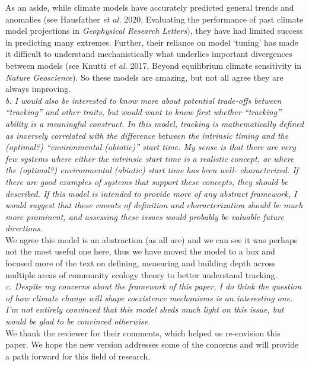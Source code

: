 \documentclass[11pt]{article}
\begin{document}
As an aside, while climate models have accurately predicted general trends and anomalies (see Hausfather \emph{et al.} 2020, Evaluating the performance of past climate model projections in \emph{Geophysical Research Letters}), they have had limited success in predicting many extremes. Further, their reliance on model `tuning' has made it difficult to understand mechanistically what underlies important divergences between models (see Knutti \emph{et al.} 2017, Beyond equilibrium climate sensitivity in \emph{Nature Geoscience}). So these models are amazing, but not all agree they are always improving. \\

\emph{b.      I would also be interested to know more about potential trade-offs between ``tracking''
and other traits, but would want to know first whether ``tracking'' ability is a meaningful
construct. In this model, tracking is mathematically defined as inversely correlated with the
difference between the intrinsic timing and the (optimal?) ``environmental (abiotic)'' start
time. My sense is that there are very few systems where either the intrinsic start time is a
realistic concept, or where the (optimal?) environmental (abiotic) start time has been well-
characterized. If there are good examples of systems that support these concepts, they should
be described. If this model is intended to provide more of any abstract framework, I would
suggest that these caveats of definition and characterization should be much more prominent,
and assessing these issues would probably be valuable future directions.}\\

We agree this model is an abstraction (as all are) and we can see it was perhaps not the most useful one here, thus we have moved the model to a box and focused more of the text on defining, measuring and building depth across multiple areas of community ecology theory to better understand tracking.\\

\emph{c.      Despite my concerns about the framework of this paper, I do think the question of how
climate change will shape coexistence mechanisms is an interesting one. I'm not entirely
convinced that this model sheds much light on this issue, but would be glad to be convinced
otherwise.}\\

We thank the reviewer for their comments, which helped us re-envision this paper. We hope the new version addresses some of the concerns and will provide a path forward for this field of research.\\
\end{document}
